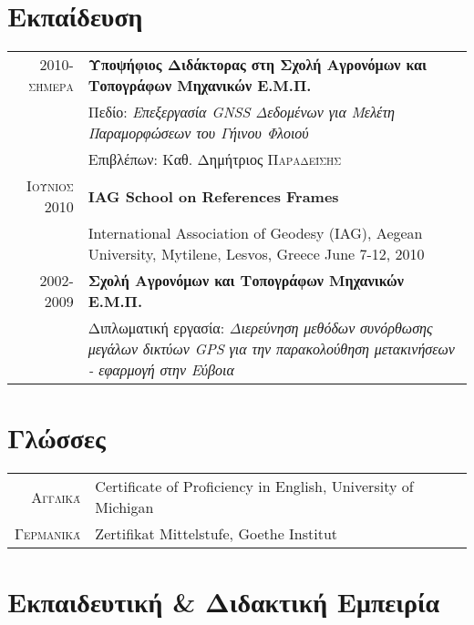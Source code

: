 \documentclass[a4paper,10pt]{article} %
\begin{document}
\section{Εκπαίδευση}
\begin{tabular}{rp{13cm}}

  \textsc{2010-σήμερα} &\textbf{Υποψήφιος Διδάκτορας στη Σχολή Αγρονόμων και Τοπογράφων Μηχανικών Ε.Μ.Π.}\\
   & Πεδίο: \textit{Επεξεργασία GNSS Δεδομένων για Μελέτη Παραμορφώσεων του Γήινου Φλοιού}\\
   & \small Επιβλέπων: Καθ. Δημήτριος \textsc{Παραδείσης}\\

  \textsc{Ιούνιος 2010} & \textbf{IAG School on References Frames}\\
    & International Association of Geodesy \small{(IAG)}, Aegean University, Mytilene, Lesvos, Greece June 7-12, 2010\\

  \textsc{2002-2009} & \textbf{Σχολή Αγρονόμων και Τοπογράφων Μηχανικών Ε.Μ.Π.}\\
  & Διπλωματική εργασία: 
  \textit{Διερεύνηση μεθόδων συνόρθωσης μεγάλων δικτύων GPS για την παρακολούθηση μετακινήσεων - εφαρμογή στην Εύβοια}\\

\end{tabular}
\medskip

\section{Γλώσσες}
\begin{tabular}{rp{13cm}}

\textsc{Αγγλικά} & Certificate of Proficiency in English, University of Michigan \\
\textsc{Γερμανικά} & Zertifikat Mittelstufe, Goethe Institut\\

\end{tabular}
\medskip

\section{Εκπαιδευτική \& Διδακτική Εμπειρία}
\end{document}
